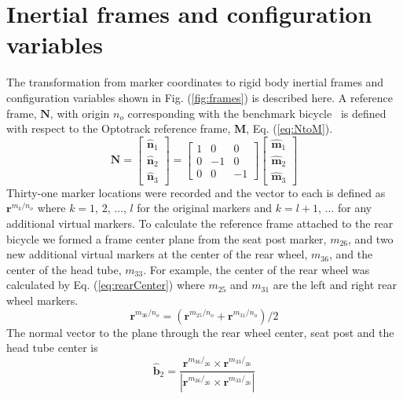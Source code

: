 \section{Inertial frames and configuration variables}
\label{sec:inFrames}
The transformation from marker coordinates to rigid body inertial frames and
configuration variables shown in Fig. (\ref{fig:frames}) is described here. A
reference frame, $\mathbf{N}$, with origin $n_o$ corresponding with the
benchmark bicycle~\cite{Meijaard2007} is defined with respect to the Optotrack
reference frame, $\mathbf{M}$, Eq. (\ref{eq:NtoM}).
\begin{equation}
    \mathbf{N}=
    \left[
    \begin{array}{c}
    \hat{\mathbf{n}}_1\\
    \hat{\mathbf{n}}_2\\
    \hat{\mathbf{n}}_3
  \end{array}
    \right]
    =
    \left[
    \begin{array}{rrr}
    1 &  0 &  0\\
    0 & -1 &  0\\
    0 &  0 & -1
    \end{array}
    \right]
    \left[
    \begin{array}{c}
    \hat{\mathbf{m}}_1\\
    \hat{\mathbf{m}}_2\\
    \hat{\mathbf{m}}_3
  \end{array}
    \right]
\label{eq:NtoM}
\end{equation}
Thirty-one marker locations were recorded and the vector to each is defined as
$\mathbf{r}^{{m_{k}}/{n_o}}$ where $k=1$, $2$, $\ldots$, $l$ for the original
markers and $k=l+1$, $\ldots$ for any additional virtual markers.  To calculate
the reference frame attached to the rear bicycle we formed a frame center plane
from the seat post marker, $m_{26}$, and two new additional virtual markers at
the center of the rear wheel, $m_{36}$, and the center of the head tube,
$m_{33}$. For example, the center of the rear wheel was calculated by Eq.
(\ref{eq:rearCenter}) where $m_{25}$ and $m_{31}$ are the left and right rear
wheel markers.
\begin{equation}
    \mathbf{r}^{{m_{36}}/{n_o}}=(\mathbf{r}^{{m_{25}}/{n_o}}+\mathbf{r}^{{m_{31}}/{n_o}})/2
\label{eq:rearCenter}
\end{equation}
The normal vector to the plane through the rear wheel center, seat post and the
head tube center is
\begin{equation}
\hat{\mathbf{b}}_2=\frac{\mathbf{r}^{{m_{36}}/_{26}}\times\mathbf{r}^{{m_{33}}/_{26}}}{|\mathbf{r}^{{m_{36}}/_{26}}\times\mathbf{r}^{{m_{33}}/_{26}}|}
\label{eq:b2}
\end{equation}
